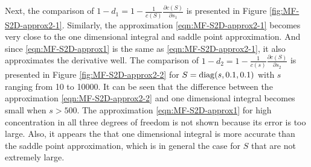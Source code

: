 Next, the comparison of $1-d_1 = 1-\tfrac{1}{c(S)} \tfrac{\partial c(S)}{\partial s_1}$ is presented in Figure \ref{fig:MF-S2D-approx2-1}.
Similarly, the approximation \eqref{eqn:MF-S2D-approx2-1} becomes very close to the one dimensional integral and saddle point approximation.
And since \eqref{eqn:MF-S2D-approx1} is the same as \eqref{eqn:MF-S2D-approx2-1}, it also approximates the derivative well.
The comparison of $1-d_2 = 1-\tfrac{1}{c(s)}\tfrac{\partial c(S)}{\partial s_2}$ is presented in Figure \ref{fig:MF-S2D-approx2-2} for $S = \mathrm{diag}(s,0.1,0.1)$ with $s$ ranging from 10 to 10000.
It can be seen that the difference between the approximation \eqref{eqn:MF-S2D-approx2-2} and one dimensional integral becomes small when $s>500$.
The approximation \eqref{eqn:MF-S2D-approx1} for high concentration in all three degrees of freedom is not shown because its error is too large.
Also, it appears the that one dimensional integral is more accurate than the saddle point approximation, which is in general the case for $S$ that are not extremely large.


